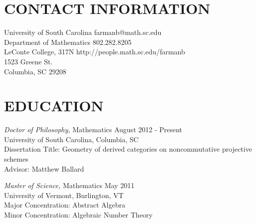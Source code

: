 \documentclass[line,overlapped]{res}
\begin{document}

\begin{resume}
  
  
  \section{CONTACT INFORMATION}
  University of South Carolina \hfill farmanb@math.sc.edu\\
  Department of Mathematics \hfill 802.282.8205\\
  LeConte College, 317N \hfill http://people.math.sc.edu/farmanb\\
  1523 Greene St.\\
  Columbia, SC 29208
  
  \section{EDUCATION} 
          {\sl Doctor of Philosophy,} Mathematics \hfill August 2012 - Present\\
          University of South Carolina, Columbia, SC\\
          Dissertation Title: Geometry of derived categories on noncommutative projective schemes\\
          Advisor: Matthew Ballard

          {\sl Master of Science,} Mathematics \hfill May 2011\\
          University of Vermont, Burlington, VT\\
          Major Concentration: Abstract Algebra\\
          Minor Concentration: Algebraic Number Theory


\end{resume}
\end{document}
